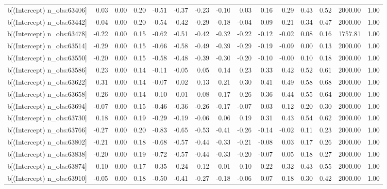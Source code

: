 \begin{table}[ht]
\begin{tabular}{rrrrrrrrrrrrrrr}
  b[(Intercept) n\_obs:63406] & 0.03 & 0.00 & 0.20 & -0.51 & -0.37 & -0.23 & -0.10 & 0.03 & 0.16 & 0.29 & 0.43 & 0.52 & 2000.00 & 1.00 \\ 
  b[(Intercept) n\_obs:63442] & -0.04 & 0.00 & 0.20 & -0.54 & -0.42 & -0.29 & -0.18 & -0.04 & 0.09 & 0.21 & 0.34 & 0.47 & 2000.00 & 1.00 \\ 
  b[(Intercept) n\_obs:63478] & -0.22 & 0.00 & 0.15 & -0.62 & -0.51 & -0.42 & -0.32 & -0.22 & -0.12 & -0.02 & 0.08 & 0.16 & 1757.81 & 1.00 \\ 
  b[(Intercept) n\_obs:63514] & -0.29 & 0.00 & 0.15 & -0.66 & -0.58 & -0.49 & -0.39 & -0.29 & -0.19 & -0.09 & 0.00 & 0.13 & 2000.00 & 1.00 \\ 
  b[(Intercept) n\_obs:63550] & -0.20 & 0.00 & 0.15 & -0.58 & -0.48 & -0.39 & -0.30 & -0.20 & -0.10 & -0.00 & 0.10 & 0.18 & 2000.00 & 1.00 \\ 
  b[(Intercept) n\_obs:63586] & 0.23 & 0.00 & 0.14 & -0.11 & -0.05 & 0.05 & 0.14 & 0.23 & 0.33 & 0.42 & 0.52 & 0.61 & 2000.00 & 1.00 \\ 
  b[(Intercept) n\_obs:63622] & 0.31 & 0.00 & 0.14 & -0.07 & 0.02 & 0.13 & 0.21 & 0.30 & 0.41 & 0.49 & 0.58 & 0.68 & 2000.00 & 1.00 \\ 
  b[(Intercept) n\_obs:63658] & 0.26 & 0.00 & 0.14 & -0.10 & -0.01 & 0.08 & 0.17 & 0.26 & 0.36 & 0.44 & 0.55 & 0.64 & 2000.00 & 1.00 \\ 
  b[(Intercept) n\_obs:63694] & -0.07 & 0.00 & 0.15 & -0.46 & -0.36 & -0.26 & -0.17 & -0.07 & 0.03 & 0.12 & 0.20 & 0.30 & 2000.00 & 1.00 \\ 
  b[(Intercept) n\_obs:63730] & 0.18 & 0.00 & 0.19 & -0.29 & -0.19 & -0.06 & 0.06 & 0.19 & 0.31 & 0.43 & 0.54 & 0.62 & 2000.00 & 1.00 \\ 
  b[(Intercept) n\_obs:63766] & -0.27 & 0.00 & 0.20 & -0.83 & -0.65 & -0.53 & -0.41 & -0.26 & -0.14 & -0.02 & 0.11 & 0.23 & 2000.00 & 1.00 \\ 
  b[(Intercept) n\_obs:63802] & -0.21 & 0.00 & 0.18 & -0.68 & -0.57 & -0.44 & -0.33 & -0.21 & -0.08 & 0.03 & 0.17 & 0.26 & 2000.00 & 1.00 \\ 
  b[(Intercept) n\_obs:63838] & -0.20 & 0.00 & 0.19 & -0.72 & -0.57 & -0.44 & -0.33 & -0.20 & -0.07 & 0.05 & 0.18 & 0.27 & 2000.00 & 1.00 \\ 
  b[(Intercept) n\_obs:63874] & 0.10 & 0.00 & 0.17 & -0.35 & -0.24 & -0.12 & -0.01 & 0.10 & 0.22 & 0.32 & 0.43 & 0.55 & 2000.00 & 1.00 \\ 
  b[(Intercept) n\_obs:63910] & -0.05 & 0.00 & 0.18 & -0.50 & -0.41 & -0.27 & -0.18 & -0.06 & 0.07 & 0.18 & 0.30 & 0.42 & 2000.00 & 1.00 \\ 

\end{tabular}
\end{table}
